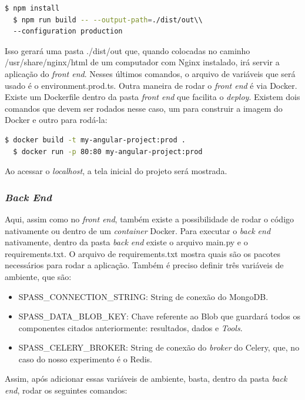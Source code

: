 \documentclass[11pt,twoside]{article}
\begin{document}
\begin{lstlisting}[language=bash]
  $ npm install 
  $ npm run build -- --output-path=./dist/out\\ 
  --configuration production
\end{lstlisting}

Isso gerará uma pasta ./dist/out que, quando colocadas no caminho /usr/share/nginx/html de um computador com Nginx instalado, irá servir a aplicação do \emph{front end}.
Nesses últimos comandos, o arquivo de variáveis que será usado é o environment.prod.ts.
Outra maneira de rodar o \emph{front end} é via Docker. Existe um Dockerfile dentro da pasta \emph{front end} que facilita o \emph{deploy}. Existem dois comandos que devem ser rodados nesse caso, um
para construir a imagem do Docker e outro para rodá-la:

\begin{lstlisting}[language=bash]
  $ docker build -t my-angular-project:prod .
  $ docker run -p 80:80 my-angular-project:prod
\end{lstlisting}

Ao acessar o \emph{localhost}, a tela inicial do projeto será mostrada.

\subsubsection{\emph{Back End}}

Aqui, assim como no \emph{front end}, também existe a possibilidade de rodar o código nativamente ou dentro de um \emph{container} Docker. Para executar o \emph{back end} nativamente, dentro da pasta \emph{back end}
existe o arquivo main.py e o requirements.txt. O arquivo de requirements.txt mostra quais são os pacotes necessários para rodar a aplicação. Também é preciso definir três
variáveis de ambiente, que são:

\begin{itemize}
  \item SPASS\_CONNECTION\_STRING: String de conexão do MongoDB.
  \item SPASS\_DATA\_BLOB\_KEY: Chave referente ao Blob que guardará todos os componentes citados anteriormente: resultados, dados e \emph{Tools}.
  \item SPASS\_CELERY\_BROKER: String de conexão do \emph{broker} do Celery, que, no caso do nosso experimento é o Redis.
\end{itemize}

Assim, após adicionar essas variáveis de ambiente, basta, dentro da pasta \emph{back end}, rodar os seguintes comandos:
\end{document}

